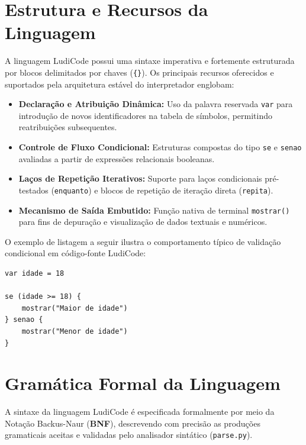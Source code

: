 \documentclass[12pt,a4paper]{article}
\begin{document}
\section{Estrutura e Recursos da Linguagem}

A linguagem LudiCode possui uma sintaxe imperativa e fortemente estruturada por blocos delimitados por chaves (\texttt{\{\}}). Os principais recursos oferecidos e suportados pela arquitetura estável do interpretador englobam:

\begin{itemize}
    \item \textbf{Declaração e Atribuição Dinâmica:} Uso da palavra reservada \texttt{var} para introdução de novos identificadores na tabela de símbolos, permitindo reatribuições subsequentes.
    \item \textbf{Controle de Fluxo Condicional:} Estruturas compostas do tipo \texttt{se} e \texttt{senao} avaliadas a partir de expressões relacionais booleanas.
    \item \textbf{Laços de Repetição Iterativos:} Suporte para laços condicionais pré-testados (\texttt{enquanto}) e blocos de repetição de iteração direta (\texttt{repita}).
    \item \textbf{Mecanismo de Saída Embutido:} Função nativa de terminal \texttt{mostrar()} para fins de depuração e visualização de dados textuais e numéricos.
\end{itemize}

O exemplo de listagem a seguir ilustra o comportamento típico de validação condicional em código-fonte LudiCode:

\begin{lstlisting}[caption={Exemplo de estrutura de controle condicional}]
var idade = 18

se (idade >= 18) {
    mostrar("Maior de idade")
} senao {
    mostrar("Menor de idade")
}
\end{lstlisting}

\section{Gramática Formal da Linguagem}

A sintaxe da linguagem LudiCode é especificada formalmente por meio da Notação Backus-Naur (\textbf{BNF}), descrevendo com precisão as produções gramaticais aceitas e validadas pelo analisador sintático (\texttt{parse.py}).
\end{document}
